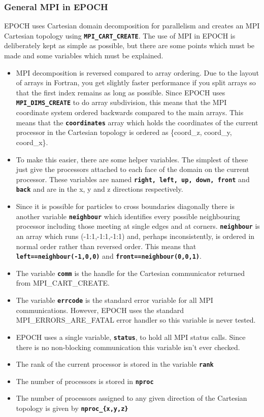 \documentclass[12pt]{article}
\newcommand{\inlinecode}[1]{{\color{warwickred} \bf\texttt{#1}}}
\newcommand{\EPOCH}{{\color{warwickdark}\fontfamily{phv}\selectfont EPOCH} }
\begin{document}
\subsubsection{General MPI in \EPOCH}
\EPOCH uses Cartesian domain decomposition for parallelism and creates an MPI
Cartesian topology using \inlinecode{MPI\_CART\_CREATE}.  The use of MPI in
\EPOCH is deliberately kept as simple as possible, but there are some points
which must be made and some variables which must be explained.
\begin{itemize}
\item MPI decomposition is reversed compared to array ordering. Due to the
  layout of arrays in Fortran, you get slightly faster performance if you split
  arrays so that the first index remains as long as possible. Since \EPOCH uses
  \inlinecode{MPI\_DIMS\_CREATE} to do array subdivision, this means that the
  MPI coordinate system ordered backwards compared to the main arrays. This
  means that the \inlinecode{coordinates} array which holds the coordinates of
  the current processor in the Cartesian topology is ordered as \{coord\_z,
  coord\_y, coord\_x\}.
\item To make this easier, there are some helper variables. The simplest of
  these just give the processors attached to each face of the domain on the
  current processor. These variables are named \inlinecode{right, left, up,
    down, front} and \inlinecode{back} and are in the x, y and z directions
  respectively.
\item Since it is possible for particles to cross boundaries diagonally there
  is another variable \inlinecode{neighbour} which identifies every possible
  neighbouring processor including those meeting at single edges and at
  corners. \inlinecode{neighbour} is an array which runs (-1:1,-1:1,-1:1) and,
  perhaps inconsistently, is ordered in normal order rather than reversed
  order. This means that \inlinecode{left==neighbour(-1,0,0)} and
  \inlinecode{front==neighbour(0,0,1)}.
\item The variable \inlinecode{comm} is the handle for the Cartesian
  communicator returned from MPI\_CART\_CREATE.
\item The variable \inlinecode{errcode} is the standard error variable for all
  MPI communications. However, \EPOCH uses the standard MPI\_ERRORS\_ARE\_FATAL
  error handler so this variable is never tested.
\item \EPOCH uses a single variable, \inlinecode{status}, to hold all MPI
  status calls. Since there is no non-blocking communication this variable
  isn't ever checked.
\item The rank of the current processor is stored in the variable
  \inlinecode{rank}
\item The number of processors is stored in \inlinecode{nproc}
\item The number of processors assigned to any given direction of the Cartesian
  topology is given by \inlinecode{nproc\_\{x,y,z\}}
\end{itemize}
\end{document}
